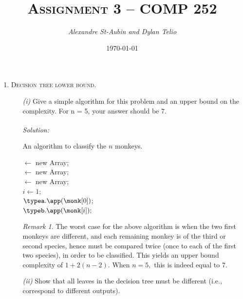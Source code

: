 \documentclass[12pt]{article}
\title{\textsc{Assignment 3 -- COMP 252}}
\author{\it Alexandre St-Aubin and Dylan Telio}
\date{\today}
\theoremstyle{definition}
\theoremstyle{remark}
\newtheorem*{remark}{Remark}
\newcommand\sol{%
  \\ 
  \\
  \textit{Solution:}\\%
}
\begin{document}
\maketitle 
\begin{enumerate}
  \item \textsc{Decision tree lower bound.}
  \begin{enumerate}
    \item[\it (i)]Give a simple algorithm for this problem and an upper bound on the complexity. For n = 5, your answer should be 7.
    \sol
    \begin{algorithm}
    \caption{An algorithm to classify the $n$ monkeys. }
    \BlankLine
    \typea $\leftarrow$ new Array;  \\ 
    \typeb $\leftarrow$ new Array;  \\ 
    \typec $\leftarrow$ new Array;  \\ 
    $i \leftarrow 1;$\\ 
    $\typea.\app(\monk[0])$;\\
      $\typeb.\app (\monk[i]);$
    \BlankLine 
  \end{algorithm}
    \begin{remark} 
      The worst case for the above algorithm is when the two first monkeys are different, and each remaining monkey is of the third or second species, hence must be compared twice (once to each of the first two species), in order to be classified. This yields an upper bound complexity of $1 + 2(n-2).$ When $n = 5, $ this is indeed equal to 7.
    \end{remark} 
    \newpage
    \item[\it (ii)] Show that all leaves in the decision tree must be different (i.e., correspond to different outputs).

\end{enumerate}
\end{enumerate}
\end{document}
